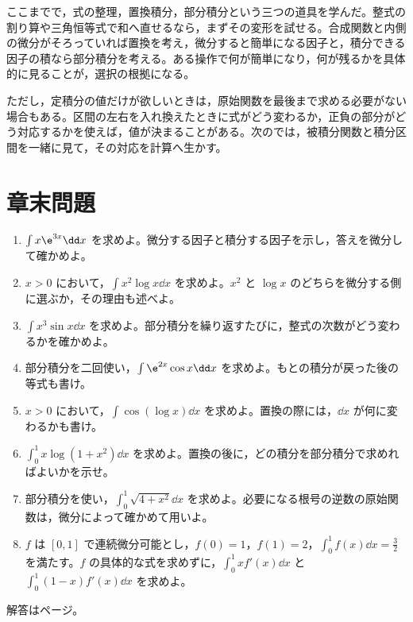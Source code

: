 ここまでで，式の整理，置換積分，部分積分という三つの道具を学んだ。整式の割り算や三角恒等式で和へ直せるなら，まずその変形を試せる。合成関数と内側の微分がそろっていれば置換を考え，微分すると簡単になる因子と，積分できる因子の積なら部分積分を考える。ある操作で何が簡単になり，何が残るかを具体的に見ることが，選択の根拠になる。

ただし，定積分の値だけが欲しいときは，原始関数を最後まで求める必要がない場合もある。区間の左右を入れ換えたときに式がどう変わるか，正負の部分がどう対応するかを使えば，値が決まることがある。次のでは，被積分関数と積分区間を一緒に見て，その対応を計算へ生かす。

\section*{章末問題}
\begin{enumerate}[label=\textbf{\thechapter.\arabic*},leftmargin=*]
 \item\label{問:部分一次指数} $\int x\e^{3x}\dd x$ を求めよ。微分する因子と積分する因子を示し，答えを微分して確かめよ。
 \item\label{問:部分整式対数} $x>0$ において，$\int x^2\log x\dd x$ を求めよ。$x^2$ と $\log x$ のどちらを微分する側に選ぶか，その理由も述べよ。
 \item\label{問:部分反復} $\int x^3\sin x\dd x$ を求めよ。部分積分を繰り返すたびに，整式の次数がどう変わるかを確かめよ。
 \item\label{問:部分循環} 部分積分を二回使い，$\int\e^{2x}\cos x\dd x$ を求めよ。もとの積分が戻った後の等式も書け。
 \item\label{問:部分対数余弦} $x>0$ において，$\int\cos(\log x)\dd x$ を求めよ。置換の際には，$\dd x$ が何に変わるかも書け。
 \item\label{問:部分置換定積分} $\int_0^1x\log(1+x^2)\dd x$ を求めよ。置換の後に，どの積分を部分積分で求めればよいかを示せ。
 \item\label{問:部分根号定積分} 部分積分を使い，$\int_0^1\sqrt{4+x^2}\dd x$ を求めよ。必要になる根号の逆数の原始関数は，微分によって確かめて用いよ。
 \item\label{問:部分情報だけの計算} $f$ は $[0,1]$ で連続微分可能とし，$f(0)=1$，$f(1)=2$，$\int_0^1f(x)\dd x=\frac32$ を満たす。$f$ の具体的な式を求めずに，$\int_0^1xf'(x)\dd x$ と $\int_0^1(1-x)f'(x)\dd x$ を求めよ。
\end{enumerate}

\smallskip\noindent 解答は\pageref{解答:第6章}ページ。
